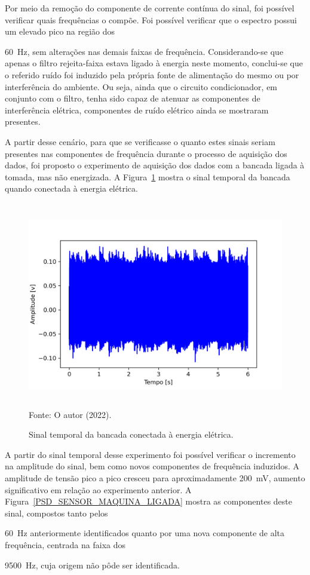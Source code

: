 \documentclass[
	12pt,				
	oneside,			
	a4paper,			
	english,			
	brazil,			
	]{abntex2ppgsi}
\begin{document}
Por meio da remoção do componente de corrente contínua do sinal, foi possível verificar quais frequências o compõe. Foi possível verificar que o espectro possui um elevado pico na região dos {\SI{60}{\hertz}, sem alterações nas demais faixas de frequência. Considerando-se que apenas o filtro rejeita-faixa estava ligado à energia neste momento, conclui-se que o referido ruído foi induzido pela própria fonte de alimentação do mesmo ou por interferência do ambiente. Ou seja, ainda que o circuito condicionador, em conjunto com o filtro, tenha sido capaz de atenuar as componentes de interferência elétrica, componentes de ruído elétrico ainda se mostraram presentes. 

A partir desse cenário, para que se verificasse o quanto estes sinais seriam presentes nas componentes de frequência durante o processo de aquisição dos dados, foi proposto o experimento de aquisição dos dados com a bancada ligada à tomada, mas não energizada. A Figura~\ref{maquina_ligada_na_tomada} mostra o sinal temporal da bancada quando conectada à energia elétrica.

\begin{figure}[H]
\centering
\caption {Sinal temporal da bancada conectada à energia elétrica.}
\includegraphics[width=\textwidth,height=90mm,keepaspectratio]{Caso0/maquina_ligada_na_tomada} \\
Fonte: O autor (2022).
\label{maquina_ligada_na_tomada}
\end{figure} 

A partir do sinal temporal desse experimento foi possível verificar o incremento na amplitude do sinal, bem como novos componentes de frequência induzidos. A amplitude de tensão pico a pico cresceu para aproximadamente {\SI{200}{\milli\volt}}, aumento significativo em relação ao experimento anterior. A Figura~\ref{PSD_SENSOR_MAQUINA_LIGADA} mostra as componentes deste sinal, compostos tanto pelos {\SI{60}{\hertz} anteriormente identificados quanto por uma nova componente de alta frequência, centrada na faixa dos {\SI{9500}{\hertz}, cuja origem não pôde ser identificada. 

}}}
\end{document}
